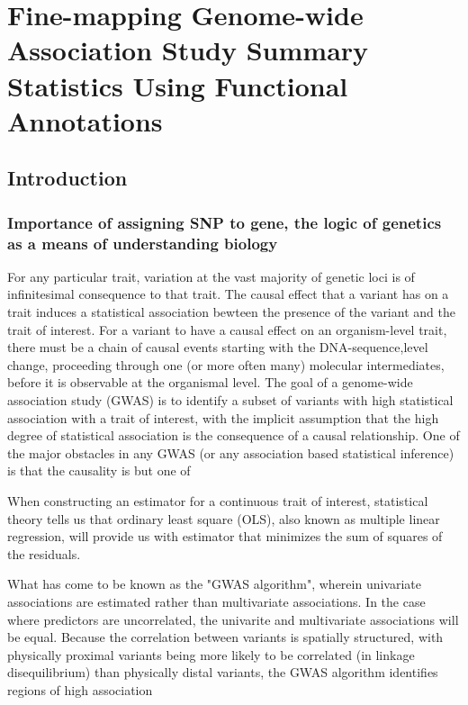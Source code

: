 \chapter{Fine-mapping Genome-wide Association Study Summary Statistics Using Functional Annotations}

\section{Introduction}\label{sec:org59556ac}

\subsection{Importance of assigning SNP to gene, the logic of genetics as a means of understanding biology}\label{sec:org1481578}

For any particular trait, variation at the vast majority of genetic loci is of infinitesimal consequence to that trait.  The causal
effect that a variant has on a trait induces a statistical association bewteen the presence of the variant and the trait of interest.
For a variant to have a causal effect on an organism-level trait, there must be a chain of causal events starting with the DNA-sequence,level change, proceeding through one
(or more often many) molecular intermediates, before it is observable at the organismal level.   The goal of a genome-wide association study (GWAS) is to identify a subset of variants with high statistical association with a trait of interest, with the implicit assumption that the high degree of statistical association is the consequence of a causal relationship.
One of the major obstacles in any GWAS (or any association based statistical inference) is that the causality is
but one of


When constructing an estimator for a continuous trait of interest, statistical theory tells us that ordinary least square (OLS),
 also known as multiple linear regression, will provide us with estimator that minimizes the sum of squares of the residuals.

What has come to be known as the "GWAS algorithm", wherein univariate associations are estimated rather than multivariate associations.
In the case where predictors are uncorrelated, the univarite and multivariate associations will be equal.  Because the correlation between variants is 
spatially structured, with physically proximal variants being more likely to be correlated (in linkage disequilibrium) than physically distal variants, 
the GWAS algorithm identifies regions of high association


